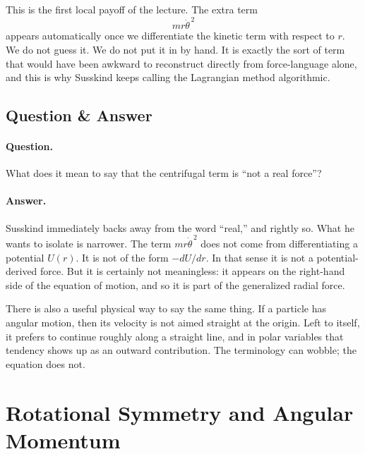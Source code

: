 This is the first local payoff of the lecture. The extra term
\begin{equation}
mr\dot\theta^{\,2}
\end{equation}
appears automatically once we differentiate the kinetic term with respect to \(r\). We do not guess it. We do not put it in by hand. It is exactly the sort of term that would have been awkward to reconstruct directly from force-language alone, and this is why Susskind keeps calling the Lagrangian method algorithmic.

\subsection{Question \& Answer}

\paragraph{Question.} What does it mean to say that the centrifugal term is ``not a real force''?

\paragraph{Answer.} Susskind immediately backs away from the word ``real,'' and rightly so. What he wants to isolate is narrower. The term \(mr\dot\theta^{\,2}\) does not come from differentiating a potential \(U(r)\). It is not of the form \(-dU/dr\). In that sense it is not a potential-derived force. But it is certainly not meaningless: it appears on the right-hand side of the equation of motion, and so it is part of the generalized radial force.

There is also a useful physical way to say the same thing. If a particle has angular motion, then its velocity is not aimed straight at the origin. Left to itself, it prefers to continue roughly along a straight line, and in polar variables that tendency shows up as an outward contribution. The terminology can wobble; the equation does not.

\section{Rotational Symmetry and Angular Momentum}

